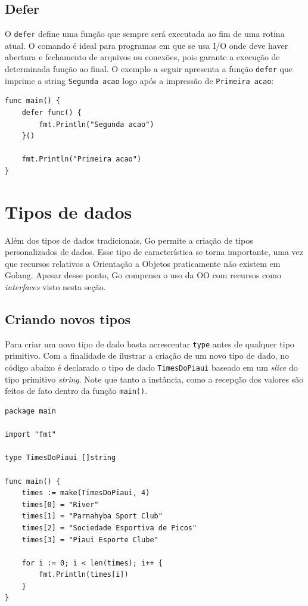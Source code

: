 \documentclass{SBCbookchapter}
\begin{document}
\subsection{Defer}

O \texttt{defer} define uma função que sempre será executada ao fim de uma rotina atual. O comando é ideal para programas em que se usa I/O onde deve haver abertura e fechamento de arquivos ou conexões, pois garante a execução de determinada função ao final. O exemplo a seguir apresenta a função \texttt{defer} que imprime a string \texttt{Segunda acao} logo após a impressão de \texttt{Primeira acao}:

\begin{lstlisting}
func main() {
	defer func() {
		fmt.Println("Segunda acao")
	}()
	
	fmt.Println("Primeira acao")
}
\end{lstlisting}

\section{Tipos de dados}

Além dos tipos de dados tradicionais, Go permite a criação de tipos personalizados de dados. Esse tipo de característica se torna importante, uma vez que recursos relativos a Orientação a Objetos praticamente não existem em Golang. Apesar desse ponto, Go compensa o uso da OO com recursos como \textit{interfaces} visto nesta seção.

\subsection{Criando novos tipos}

Para criar um novo tipo de dado basta acrescentar \texttt{type} antes de qualquer tipo primitivo. Com a finalidade de ilustrar a criação de um novo tipo de dado, no código abaixo é declarado o tipo de dado \texttt{TimesDoPiaui} baseado em um \textit{slice} do tipo primitivo \textit{string}. Note que tanto a instância, como a recepção dos valores são feitos de fato dentro da função \texttt{main()}.

\begin{lstlisting}
package main

import "fmt"

type TimesDoPiaui []string

func main() {	
	times := make(TimesDoPiaui, 4)
	times[0] = "River"
	times[1] = "Parnahyba Sport Club"
	times[2] = "Sociedade Esportiva de Picos"
	times[3] = "Piaui Esporte Clube"
	
	for i := 0; i < len(times); i++ {
		fmt.Println(times[i])
	}	
}

\end{lstlisting}
\end{document}
